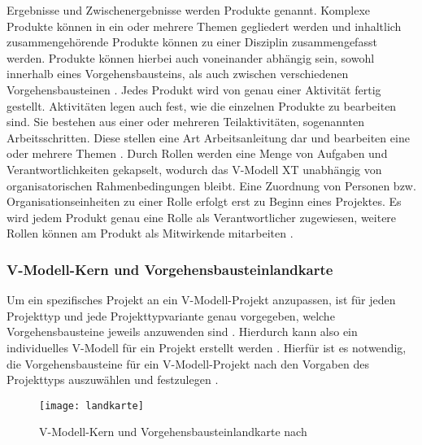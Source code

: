 Ergebnisse und Zwischenergebnisse werden Produkte genannt. Komplexe Produkte können in ein oder mehrere Themen gegliedert werden und inhaltlich zusammengehörende Produkte können zu einer Disziplin zusammengefasst werden. Produkte können hierbei auch voneinander abhängig sein, sowohl innerhalb eines Vorgehensbausteins, als auch zwischen verschiedenen Vorgehensbausteinen \cite{2004vmodell}.\newline
Jedes Produkt wird von genau einer Aktivität fertig gestellt. Aktivitäten legen auch fest, wie die einzelnen Produkte zu bearbeiten sind. Sie bestehen aus einer oder mehreren Teilaktivitäten, sogenannten Arbeitsschritten. Diese stellen eine Art Arbeitsanleitung dar und bearbeiten eine oder mehrere Themen \cite{2004vmodell}.\newline
Durch Rollen werden eine Menge von Aufgaben und Verantwortlichkeiten gekapselt, wodurch das V-Modell XT unabhängig von organisatorischen Rahmenbedingungen bleibt. Eine Zuordnung von Personen bzw. Organisationseinheiten zu einer Rolle erfolgt erst zu Beginn eines Projektes. Es wird jedem Produkt genau eine Rolle als Verantwortlicher zugewiesen, weitere Rollen können am Produkt als Mitwirkende mitarbeiten \cite{2004vmodell}. \newline



\subsubsection{V-Modell-Kern und Vorgehensbausteinlandkarte}

Um ein spezifisches Projekt an ein V-Modell-Projekt anzupassen, ist für jeden Projekttyp und jede Projekttypvariante genau vorgegeben, welche Vorgehensbausteine jeweils anzuwenden sind \cite{2004vmodell}. Hierdurch kann also ein individuelles V-Modell für ein Projekt erstellt werden \cite{heinrich2007}. Hierfür ist es notwendig, die Vorgehensbausteine für ein V-Modell-Projekt nach den Vorgaben des Projekttyps auszuwählen und festzulegen \cite{2004vmodell}. \newline

\begin{figure}[htp]
\begin{center}
  \texttt{[image: landkarte]} %
  \caption{V-Modell-Kern und Vorgehensbausteinlandkarte nach \cite{2004vmodell}}
  \label{fig:landkarte}
\end{center}
\end{figure}

